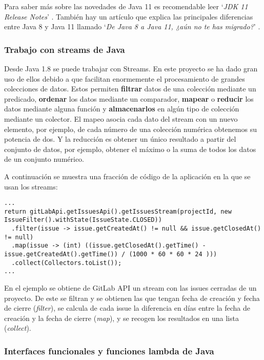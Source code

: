 Para saber más sobre las novedades de Java 11 es recomendable leer `\textit{JDK 11 Release Notes}' \citep{oracle_jdk_nodate}. También hay un artículo que explica las principales diferencias entre Java 8 y Java 11 llamado `\textit{De Java 8 a Java 11, ¿aún no te has migrado?}' \citep{del_hoyo_java_2019}.

\subsubsection{Trabajo con streams de Java}

Desde Java 1.8 se puede trabajar con Streams. En este proyecto se ha dado gran uso de ellos debido a que facilitan enormemente el procesamiento de grandes colecciones de datos. Estos permiten \textbf{filtrar} datos de una colección mediante un predicado, \textbf{ordenar} los datos mediante un comparador, \textbf{mapear} o \textbf{reducir} los datos mediante alguna función y \textbf{almacenarlos} en algún tipo de colección mediante un colector. El mapeo asocia cada dato del stream con un nuevo elemento, por ejemplo, de cada número de una colección numérica obtenemos su potencia de dos. Y la reducción es obtener un único resultado a partir del conjunto de datos, por ejemplo, obtener el máximo o la suma de todos los datos de un conjunto numérico.

A continuación se muestra una fracción de código de la aplicación en la que se usan los streams:\\
\begin{minipage}{\linewidth}
{\tiny
\begin{lstlisting}[breaklines]
...
return gitLabApi.getIssuesApi().getIssuesStream(projectId, new IssueFilter().withState(IssueState.CLOSED))
  .filter(issue -> issue.getCreatedAt() != null && issue.getClosedAt() != null)
  .map(issue -> (int) ((issue.getClosedAt().getTime() - issue.getCreatedAt().getTime()) / (1000 * 60 * 60 * 24 )))
  .collect(Collectors.toList());
...
\end{lstlisting}
}
\end{minipage}

En el ejemplo se obtiene de GitLab API un stream con las issues cerradas de un proyecto. De este se filtran y se obtienen las que tengan fecha de creación y fecha de cierre (\textit{filter}), se calcula de cada issue la diferencia en días entre la fecha de creación y la fecha de cierre (\textit{map}), y se recogen los resultados en una lista (\textit{collect}).

\subsubsection{Interfaces funcionales y funciones lambda de Java}

